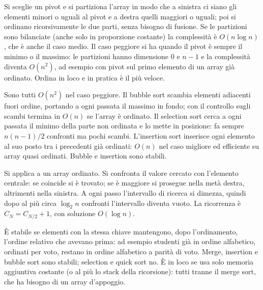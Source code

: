 \begin{orale}
Si sceglie un pivot e si partiziona l'array in modo che a sinistra ci siano gli
elementi minori o uguali al pivot e a destra quelli maggiori o uguali; poi si
ordinano ricorsivamente le due parti, senza bisogno di fusione. Se le partizioni sono
bilanciate (anche solo in proporzione costante) la complessità è $O(n \log n)$, che è
anche il caso medio. Il caso peggiore si ha quando il pivot è sempre il minimo o il
massimo: le partizioni hanno dimensione $0$ e $n-1$ e la complessità diventa
$O(n^2)$, ad esempio con pivot sul primo elemento di un array già ordinato. Ordina in
loco e in pratica è il più veloce.
\end{orale}

\begin{orale}
Sono tutti $O(n^2)$ nel caso peggiore. Il bubble sort scambia elementi adiacenti
fuori ordine, portando a ogni passata il massimo in fondo; con il controllo sugli
scambi termina in $O(n)$ se l'array è ordinato. Il selection sort cerca a ogni
passata il minimo della parte non ordinata e lo mette in posizione: fa sempre
$n(n-1)/2$ confronti ma pochi scambi. L'insertion sort inserisce ogni elemento al suo
posto tra i precedenti già ordinati: $O(n)$ nel caso migliore ed efficiente su array
quasi ordinati. Bubble e insertion sono stabili.
\end{orale}

\begin{orale}
Si applica a un array ordinato. Si confronta il valore cercato con l'elemento
centrale: se coincide si è trovato; se è maggiore si prosegue nella metà destra,
altrimenti nella sinistra. A ogni passo l'intervallo di ricerca si dimezza, quindi
dopo al più circa $\log_2 n$ confronti l'intervallo diventa vuoto. La ricorrenza è
$C_N = C_{N/2} + 1$, con soluzione $O(\log n)$.
\end{orale}

\begin{orale}
È stabile se elementi con la stessa chiave mantengono, dopo l'ordinamento, l'ordine
relativo che avevano prima: ad esempio studenti già in ordine alfabetico, ordinati
per voto, restano in ordine alfabetico a parità di voto. Merge, insertion e bubble
sort sono stabili; selection e quick sort no. È in loco se usa solo memoria
aggiuntiva costante (o al più lo stack della ricorsione): tutti tranne il merge sort,
che ha bisogno di un array d'appoggio.
\end{orale}

